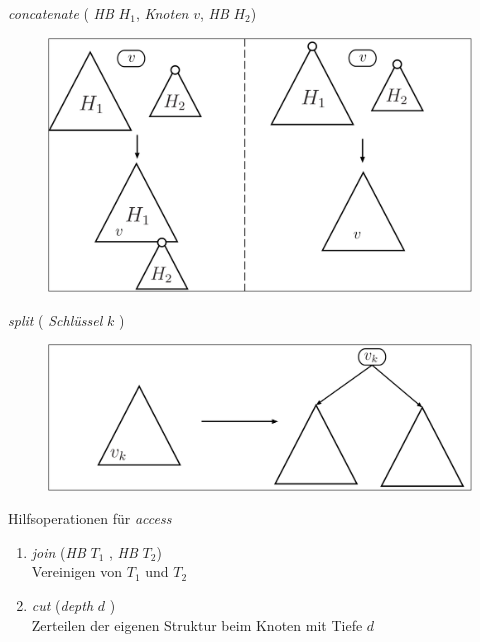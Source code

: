\documentclass[11pt]{beamer}
\begin{document}
    \begin{frame} { \textit{concatenate} ( \textit{HB} $H_1$, \textit{Knoten } $v$, \textit{HB} $H_2$)}
    	\begin{figure}[H]
    		\centering
    		\includegraphics[width=1\textwidth]{"Medien/pres/concat"}
    	\end{figure}
    \end{frame}

  \begin{frame} {\textit{split} ( \textit{Schlüssel} $k$ )}
	\begin{figure}[H]
		\centering
		\includegraphics[width=1\textwidth]{"Medien/pres/split"}
	\end{figure}
\end{frame}


\begin{frame} {Hilfsoperationen für \textit{access}}
	\begin{enumerate}
		\item\textit{join} (\textit{HB} $T_1$ , \textit{HB} $T_2$)\\
		Vereinigen von $T_1$ und $T_2$
		\item\textit{cut} (\textit{depth} $d$ )\\
		Zerteilen der eigenen Struktur beim Knoten mit Tiefe $d$
	\end{enumerate}
	
\end{frame}
\end{document}
